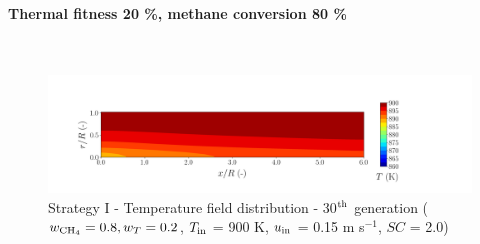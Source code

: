 \documentclass[preprint,12pt]{elsarticle}
\begin{document}

\clearpage


\paragraph{Thermal fitness 20 \%, methane conversion 80 \%} \hspace{0pt} \\
\noindent 

%

\begin{figure}[h!]
\centering
\includegraphics[width=190mm]{results/5/80C_20T/GEN30-TFIELD.png}
\caption{\label{fig:5R8020G30-TField} Strategy I - Temperature field distribution - 30$^{\rm{th}}$ generation ($w_{\rm{CH_4}} = 0.8, w_T = 0.2$, $T_{\rm{in}}$ = 900 K, $u_{\rm{in}}$ = 0.15 m s$^{-1}$, $SC$ = 2.0)}
\end{figure}

%
\end{document}
